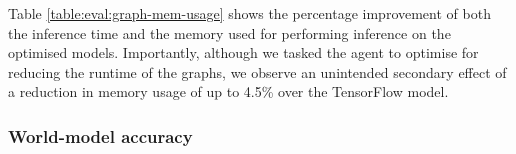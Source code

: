 \begin{table}[htbp]
  \centering
  \caption[Memory usage of optimised graphs]{Relative performance improvement of the graphs optimised by the model-based agent. We show the inference time, and memory used for performing inference on the model.}
  \label{table:eval:graph-mem-usage}
\end{table}

Table \ref{table:eval:graph-mem-usage} shows the percentage improvement of both the inference time and the memory used for performing inference on the optimised models. Importantly, although we tasked the agent to optimise for reducing the runtime of the graphs, we observe an unintended secondary effect of a reduction in memory usage of up to 4.5\% over the TensorFlow model.

\subsubsection{World-model accuracy}
\label{sec:eval:subsubsec:wm-acc}

